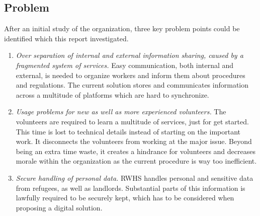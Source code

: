 
\subsection{Problem}
\label{sec:problem-definition}
After an initial study of the organization, three key problem points could be identified which this report investigated.
\begin{enumerate}
\item \textit{Over separation of internal and external information sharing, caused by a fragmented system of services.} Easy communication, both internal and external, is needed to organize workers and inform them about procedures and regulations. The current solution stores and communicates information across a multitude of platforms which are hard to synchronize. 
\item \textit{Usage problems for new as well as more experienced volunteers.} The volunteers are required to learn a multitude of services, just for get started. This time is lost to technical details instead of starting on the important work. It disconnects the volunteers from working at the major issue. Beyond being an extra time waste, it creates a hindrance for volunteers and decreases morale within the organization as the current procedure is way too inefficient.
\item \textit{Secure handling of personal data.} RWHS handles personal and sensitive data from refugees, as well as landlords. Substantial parts of this information is lawfully required to be securely kept, which has to be considered when proposing a digital solution.
\end{enumerate}

